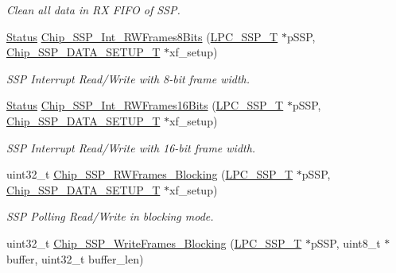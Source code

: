 \begin{DoxyCompactItemize}
\begin{DoxyCompactList}\small\item\em Clean all data in R\-X F\-I\-F\-O of S\-S\-P. \end{DoxyCompactList}\item 
\hyperlink{group__LPC__Types__Public__Types_ga67a0db04d321a74b7e7fcfd3f1a3f70b}{Status} \hyperlink{group__SSP__17XX__40XX_ga23d901d1757b6d95efc20c4d76721fb3}{Chip\-\_\-\-S\-S\-P\-\_\-\-Int\-\_\-\-R\-W\-Frames8\-Bits} (\hyperlink{structLPC__SSP__T}{L\-P\-C\-\_\-\-S\-S\-P\-\_\-\-T} $\ast$p\-S\-S\-P, \hyperlink{structChip__SSP__DATA__SETUP__T}{Chip\-\_\-\-S\-S\-P\-\_\-\-D\-A\-T\-A\-\_\-\-S\-E\-T\-U\-P\-\_\-\-T} $\ast$xf\-\_\-setup)
\begin{DoxyCompactList}\small\item\em S\-S\-P Interrupt Read/\-Write with 8-\/bit frame width. \end{DoxyCompactList}\item 
\hyperlink{group__LPC__Types__Public__Types_ga67a0db04d321a74b7e7fcfd3f1a3f70b}{Status} \hyperlink{group__SSP__17XX__40XX_gaf97dd891912b8312a1e0989d7a542b7b}{Chip\-\_\-\-S\-S\-P\-\_\-\-Int\-\_\-\-R\-W\-Frames16\-Bits} (\hyperlink{structLPC__SSP__T}{L\-P\-C\-\_\-\-S\-S\-P\-\_\-\-T} $\ast$p\-S\-S\-P, \hyperlink{structChip__SSP__DATA__SETUP__T}{Chip\-\_\-\-S\-S\-P\-\_\-\-D\-A\-T\-A\-\_\-\-S\-E\-T\-U\-P\-\_\-\-T} $\ast$xf\-\_\-setup)
\begin{DoxyCompactList}\small\item\em S\-S\-P Interrupt Read/\-Write with 16-\/bit frame width. \end{DoxyCompactList}\item 
uint32\-\_\-t \hyperlink{group__SSP__17XX__40XX_ga302a381ad4d291164144ad2720399078}{Chip\-\_\-\-S\-S\-P\-\_\-\-R\-W\-Frames\-\_\-\-Blocking} (\hyperlink{structLPC__SSP__T}{L\-P\-C\-\_\-\-S\-S\-P\-\_\-\-T} $\ast$p\-S\-S\-P, \hyperlink{structChip__SSP__DATA__SETUP__T}{Chip\-\_\-\-S\-S\-P\-\_\-\-D\-A\-T\-A\-\_\-\-S\-E\-T\-U\-P\-\_\-\-T} $\ast$xf\-\_\-setup)
\begin{DoxyCompactList}\small\item\em S\-S\-P Polling Read/\-Write in blocking mode. \end{DoxyCompactList}\item 
uint32\-\_\-t \hyperlink{group__SSP__17XX__40XX_gae64bd476b75c03d0b952f08ea42a09be}{Chip\-\_\-\-S\-S\-P\-\_\-\-Write\-Frames\-\_\-\-Blocking} (\hyperlink{structLPC__SSP__T}{L\-P\-C\-\_\-\-S\-S\-P\-\_\-\-T} $\ast$p\-S\-S\-P, uint8\-\_\-t $\ast$buffer, uint32\-\_\-t buffer\-\_\-len)

\end{DoxyCompactItemize}
